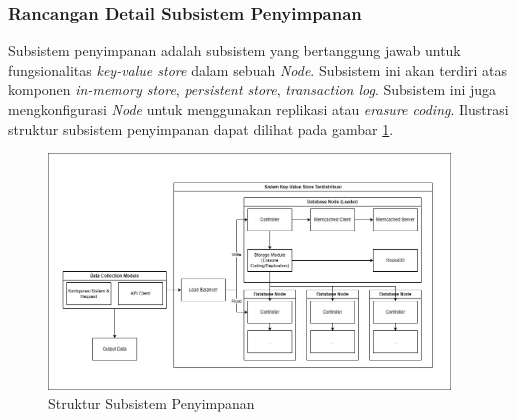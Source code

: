 \subsubsection{Rancangan Detail Subsistem Penyimpanan}
\label{subsubsection:detail-subsistem-penyimpanan}

Subsistem penyimpanan adalah subsistem yang bertanggung jawab untuk fungsionalitas \textit{key-value store} dalam sebuah \textit{Node}. Subsistem ini akan terdiri atas komponen \textit{in-memory store}, \textit{persistent store}, \textit{transaction log}. Subsistem ini juga mengkonfigurasi \textit{Node} untuk menggunakan replikasi atau \textit{erasure coding}. Ilustrasi struktur subsistem penyimpanan dapat dilihat pada gambar \ref{fig:storage-subsystem-structure}.

\begin{figure}[ht]
    \centering
    \includegraphics[width=0.95\textwidth]{resources/chapter-3/general-architecture.png}
    \caption{Struktur Subsistem Penyimpanan}
    \label{fig:storage-subsystem-structure}
\end{figure}
